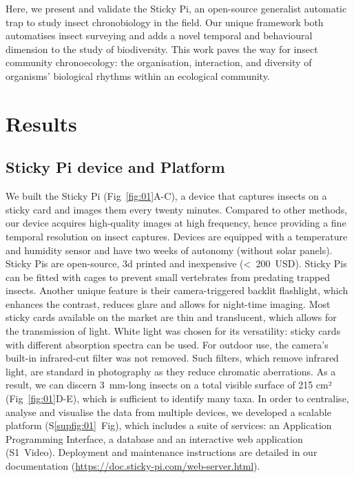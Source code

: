 \documentclass[12pt]{article}
\begin{document}
\begin{linenumbers}
		Here, we present and validate the Sticky Pi, an open-source generalist automatic trap to study insect chronobiology in the field. Our unique framework both automatises insect surveying and adds a novel temporal and behavioural dimension to the study of biodiversity. This work paves the way for insect community chronoecology: the organisation, interaction, and diversity of organisms’ biological rhythms within an ecological community. 
		
		
		
		\section*{Results}
		
		\subsection*{Sticky Pi device and Platform}
		
		We built the Sticky Pi (Fig~\ref{fig:01}A-C), a device that captures insects on a sticky card and images them every twenty minutes. Compared to other methods, our device acquires high-quality images at high frequency, hence providing a fine temporal resolution on insect captures. Devices are equipped with a temperature and humidity sensor and have two weeks of autonomy (without solar panels). Sticky Pis are open-source, 3d printed and inexpensive (<~200~USD). 
		Sticky Pis can be fitted with cages to prevent small vertebrates from predating trapped insects.
		Another unique feature is their camera-triggered backlit flashlight, which enhances the contrast, reduces glare and allows for night-time imaging. Most sticky cards available on the market are thin and translucent, which allows for the transmission of light. 
		White light was chosen for its versatility: sticky cards with different absorption spectra can be used. 
        For outdoor use, the camera's built-in infrared-cut filter was not removed. 
        Such filters, which remove infrared light, are standard in photography as they reduce chromatic aberrations.
		As a result, we can discern 3~mm-long insects on a total visible surface of 215 cm² (Fig~\ref{fig:01}D-E), which is sufficient to identify many taxa. In order to centralise, analyse and visualise the data from multiple devices, we developed a scalable platform (S\ref{supfig:01}~Fig), which includes a suite of services: an Application Programming Interface, a database and an interactive web application (S1~Video). Deployment and maintenance instructions are detailed in our documentation (\href{https://doc.sticky-pi.com/web-server.html}{https://doc.sticky-pi.com/web-server.html}).
		

\end{linenumbers}
\end{document}
